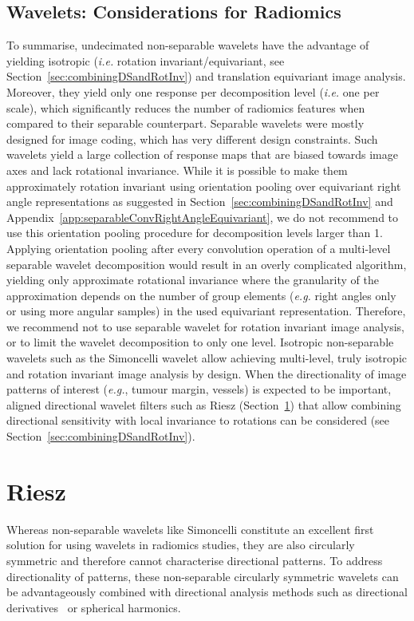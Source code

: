 \documentclass[fleqn,a4paper,oneside,openany]{book}
\begin{document}
\subsection{Wavelets: Considerations for Radiomics}\label{sec:waveletConsiderations}
%
To summarise, undecimated non-separable wavelets have the advantage of yielding isotropic (\textit{i.e.} rotation invariant/equivariant, see Section~\ref{sec:combiningDSandRotInv}) and translation equivariant image analysis. Moreover, they yield only one response per decomposition level (\textit{i.e.} one per scale), which significantly reduces the number of radiomics features when compared to their separable counterpart.
%
Separable wavelets were mostly designed for image coding, which has very different design constraints.
Such wavelets yield a large collection of response maps that are biased towards image axes and lack rotational invariance.
While it is possible to make them approximately rotation invariant using orientation pooling over equivariant right angle representations as suggested in Section~\ref{sec:combiningDSandRotInv} and Appendix~\ref{app:separableConvRightAngleEquivariant}, we do not recommend to use this orientation pooling procedure for decomposition levels larger than 1.
Applying orientation pooling after every convolution operation of a multi-level separable wavelet decomposition would result in an overly complicated algorithm, yielding only approximate rotational invariance where the granularity of the approximation depends on the number of group elements (\emph{e.g.} right angles only or using more angular samples) in the used equivariant representation.
Therefore, we recommend not to use separable wavelet for rotation invariant image analysis, or to limit the wavelet decomposition to only one level.
Isotropic non-separable wavelets such as the Simoncelli wavelet allow achieving multi-level, truly isotropic and rotation invariant image analysis by design.
When the directionality of image patterns of interest (\textit{e.g.}, tumour margin, vessels) is expected to be important, aligned directional wavelet filters such as Riesz (Section~\ref{sec:Riesz}) that allow combining directional sensitivity with local invariance to rotations can be considered (see Section~\ref{sec:combiningDSandRotInv}).
%

\section{Riesz}\label{sec:Riesz}
%
Whereas non-separable wavelets like Simoncelli constitute an excellent first solution for using wavelets in radiomics studies, they are also circularly symmetric and therefore cannot characterise directional patterns.
To address directionality of patterns, these non-separable circularly symmetric wavelets can be advantageously combined with directional analysis methods such as directional derivatives~\cite{Prasanna2014} or spherical harmonics.
\end{document}
